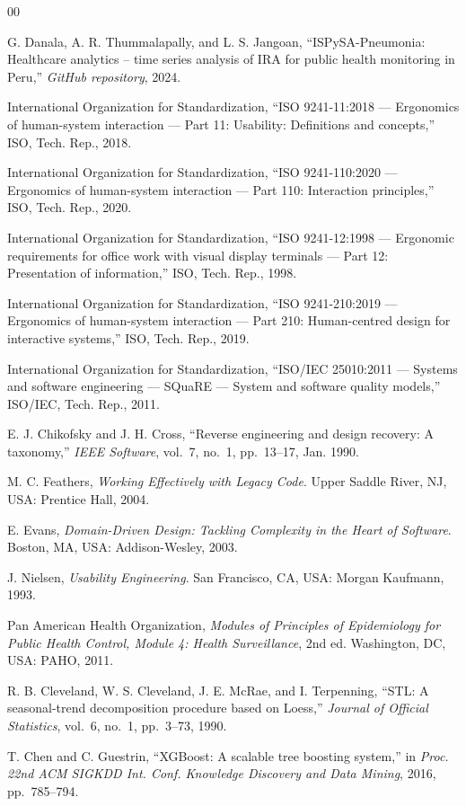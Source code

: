 \documentclass[conference]{IEEEtran}
\begin{document}
\begin{thebibliography}{00}

G. Danala, A. R. Thummalapally, and L. S. Jangoan,
``ISPySA-Pneumonia: Healthcare analytics -- time series analysis of IRA for public health monitoring in Peru,''
\textit{GitHub repository}, 2024.

International Organization for Standardization,
``ISO 9241-11:2018 --- Ergonomics of human-system interaction --- Part 11: Usability: Definitions and concepts,''
ISO, Tech. Rep., 2018.

International Organization for Standardization,
``ISO 9241-110:2020 --- Ergonomics of human-system interaction --- Part 110: Interaction principles,''
ISO, Tech. Rep., 2020.

International Organization for Standardization,
``ISO 9241-12:1998 --- Ergonomic requirements for office work with visual display terminals --- Part 12: Presentation of information,''
ISO, Tech. Rep., 1998.

International Organization for Standardization,
``ISO 9241-210:2019 --- Ergonomics of human-system interaction --- Part 210: Human-centred design for interactive systems,''
ISO, Tech. Rep., 2019.

International Organization for Standardization,
``ISO/IEC 25010:2011 --- Systems and software engineering --- SQuaRE --- System and software quality models,''
ISO/IEC, Tech. Rep., 2011.

E. J. Chikofsky and J. H. Cross,
``Reverse engineering and design recovery: A taxonomy,''
\textit{IEEE Software}, vol.~7, no.~1, pp.~13--17, Jan. 1990.

M. C. Feathers,
\textit{Working Effectively with Legacy Code}.
Upper Saddle River, NJ, USA: Prentice Hall, 2004.

E. Evans,
\textit{Domain-Driven Design: Tackling Complexity in the Heart of Software}.
Boston, MA, USA: Addison-Wesley, 2003.

J. Nielsen,
\textit{Usability Engineering}.
San Francisco, CA, USA: Morgan Kaufmann, 1993.

Pan American Health Organization,
\textit{Modules of Principles of Epidemiology for Public Health Control, Module 4: Health Surveillance}, 2nd ed.
Washington, DC, USA: PAHO, 2011.

R. B. Cleveland, W. S. Cleveland, J. E. McRae, and I. Terpenning,
``STL: A seasonal-trend decomposition procedure based on Loess,''
\textit{Journal of Official Statistics}, vol.~6, no.~1, pp.~3--73, 1990.

T. Chen and C. Guestrin,
``XGBoost: A scalable tree boosting system,''
in \textit{Proc. 22nd ACM SIGKDD Int. Conf. Knowledge Discovery and Data Mining}, 2016, pp.~785--794.

\end{thebibliography}
\end{document}

